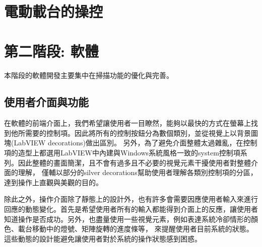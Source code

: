 \documentclass[12pt]{article}
\begin{document}
    \section{電動載台的操控}
    \section{第二階段: 軟體}
    本階段的軟體開發主要集中在掃描功能的優化與完善。
    \subsection{使用者介面與功能}
    在軟體的前端介面上，我們希望讓使用者一目瞭然，能夠以最快的方式在螢幕上找到他所需要的控制項。因此將所有的控制按鈕分為數個類別，並從視覺上以背景圖塊(LabVIEW decorations)做出區別。
    另外，為了避免介面整體太過雜亂，在控制項的造型上都選用LabVIEW中內建與Windows系統風格一致的system控制項系列。因此整體的畫面簡潔，且不會有過多且不必要的視覺元素干擾使用者對整體介面的理解，
    僅輔以部分的silver decorations幫助使用者理解各類別控制項的分區，達到操作上直觀與美觀的目的。

    除此之外，操作介面除了靜態上的設計外，也有許多會需要因應使用者輸入來進行回應的動態變化。首先是希望使用者所有的輸入都能得到介面上的反應，讓使用者知道操作是否成功。另外，也盡量使用一些視覺元素，例如表達系統冷卻情形的顏色、載台移動中的燈號、矩陣旋轉的進度條等，
    來提醒使用者目前系統的狀態。這些動態的設計能避免讓使用者對於系統的操作狀態感到困惑。
\end{document}
